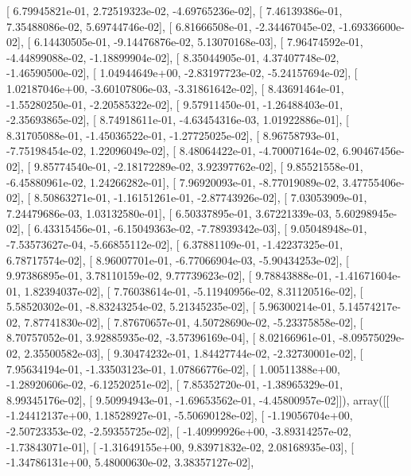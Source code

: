 \documentclass{article}
\begin{document}
       [  6.79945821e-01,   2.72519323e-02,  -4.69765236e-02],
       [  7.46139386e-01,   7.35488086e-02,   5.69744746e-02],
       [  6.81666508e-01,  -2.34467045e-02,  -1.69336600e-02],
       [  6.14430505e-01,  -9.14476876e-02,   5.13070168e-03],
       [  7.96474592e-01,  -4.44899088e-02,  -1.18899904e-02],
       [  8.35044905e-01,   4.37407748e-02,  -1.46590500e-02],
       [  1.04944649e+00,  -2.83197723e-02,  -5.24157694e-02],
       [  1.02187046e+00,  -3.60107806e-03,  -3.31861642e-02],
       [  8.43691464e-01,  -1.55280250e-01,  -2.20585322e-02],
       [  9.57911450e-01,  -1.26488403e-01,  -2.35693865e-02],
       [  8.74918611e-01,  -4.63454316e-03,   1.01922886e-01],
       [  8.31705088e-01,  -1.45036522e-01,  -1.27725025e-02],
       [  8.96758793e-01,  -7.75198454e-02,   1.22096049e-02],
       [  8.48064422e-01,  -4.70007164e-02,   6.90467456e-02],
       [  9.85774540e-01,  -2.18172289e-02,   3.92397762e-02],
       [  9.85521558e-01,  -6.45880961e-02,   1.24266282e-01],
       [  7.96920093e-01,  -8.77019089e-02,   3.47755406e-02],
       [  8.50863271e-01,  -1.16151261e-01,  -2.87743926e-02],
       [  7.03053909e-01,   7.24479686e-03,   1.03132580e-01],
       [  6.50337895e-01,   3.67221339e-03,   5.60298945e-02],
       [  6.43315456e-01,  -6.15049363e-02,  -7.78939342e-03],
       [  9.05048948e-01,  -7.53573627e-04,  -5.66855112e-02],
       [  6.37881109e-01,  -1.42237325e-01,   6.78717574e-02],
       [  8.96007701e-01,  -6.77066904e-03,  -5.90434253e-02],
       [  9.97386895e-01,   3.78110159e-02,   9.77739623e-02],
       [  9.78843888e-01,  -1.41671604e-01,   1.82394037e-02],
       [  7.76038614e-01,  -5.11940956e-02,   8.31120516e-02],
       [  5.58520302e-01,  -8.83243254e-02,   5.21345235e-02],
       [  5.96300214e-01,   5.14574217e-02,   7.87741830e-02],
       [  7.87670657e-01,   4.50728690e-02,  -5.23375858e-02],
       [  8.70757052e-01,   3.92885935e-02,  -3.57396169e-04],
       [  8.02166961e-01,  -8.09575029e-02,   2.35500582e-03],
       [  9.30474232e-01,   1.84427744e-02,  -2.32730001e-02],
       [  7.95634194e-01,  -1.33503123e-01,   1.07866776e-02],
       [  1.00511388e+00,  -1.28920606e-02,  -6.12520251e-02],
       [  7.85352720e-01,  -1.38965329e-01,   8.99345176e-02],
       [  9.50994943e-01,  -1.69653562e-01,  -4.45800957e-02]]), array([[ -1.24412137e+00,   1.18528927e-01,  -5.50690128e-02],
       [ -1.19056704e+00,  -2.50723353e-02,  -2.59355725e-02],
       [ -1.40999926e+00,  -3.89314257e-02,  -1.73843071e-01],
       [ -1.31649155e+00,   9.83971832e-02,   2.08168935e-03],
       [ -1.34786131e+00,   5.48000630e-02,   3.38357127e-02],
\end{document}
